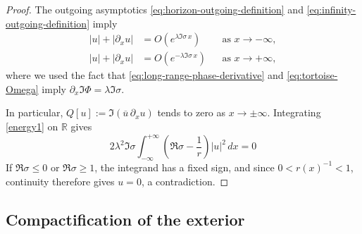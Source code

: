 \documentclass[11pt]{article}
\numberwithin{equation}{section}
\begin{document}
	\begin{proof}
		The outgoing asymptotics \eqref{eq:horizon-outgoing-definition} and \eqref{eq:infinity-outgoing-definition} imply
		\begin{equation}
			\begin{aligned}
				|u|+|\partial_xu|&=O\!\left(e^{\lambda\Im\sigma\,x}\right)
				&& \text{as } x\to-\infty,\\
				|u|+|\partial_xu|&=O\!\left(e^{-\lambda\Im\sigma\,x}\right)
				&& \text{as } x\to+\infty,
			\end{aligned}
			\label{eq:outgoing-exponential-decay}
		\end{equation}
		where we used the fact that \eqref{eq:long-range-phase-derivative}  and \eqref{eq:tortoise-Omega} imply $\partial_x\Im\Phi=\lambda\Im\sigma$. 
		
		In particular, $Q[u]:=\Im(\overline u\,\partial_xu)$
		tends to zero  as $x\rightarrow \pm \infty$. Integrating \eqref{energy1} on $\mathbb{R}$ gives
		\begin{equation}
			2\lambda^2\Im\sigma
			\int_{-\infty}^{+\infty}\left(\Re\sigma-\frac1r\right)|u|^2\,dx=0
			\label{eq:imaginary-energy-identity}
		\end{equation}
		If $\Re\sigma\leq0$ or $\Re\sigma\geq1$, the integrand has a fixed
		sign, and since
		$0<r(x)^{-1}<1$, continuity therefore gives $u=0$, a contradiction.
		
	\end{proof}
	
	\subsection{Compactification of the exterior}
	
\end{document}
